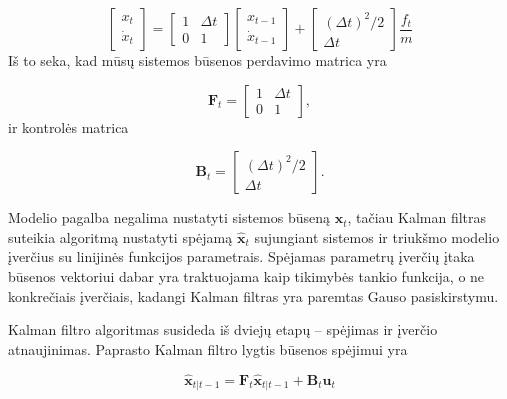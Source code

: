     \begin{equation}
        \left[ \begin{matrix} x_t \\ \dot{x}_t \end{matrix} \right] = 
        \left[ \begin{matrix} 1 & \Delta t \\ 0 & 1\end{matrix} \right]
        \left[ \begin{matrix} x_{t-1} \\ \dot{x}_{t-1} \end{matrix} \right] +
        \left[ \begin{matrix} (\Delta t)^2 / 2 \\ \Delta t \end{matrix} \right] \frac{f_t}{m}
    \end{equation}
    Iš to seka, kad mūsų sistemos būsenos perdavimo matrica yra 

    \begin{equation}
        \mathbf{F}_t = \left[ \begin{matrix} 1 & \Delta t \\ 0 & 1 \end{matrix} \right],
    \end{equation}
    ir kontrolės matrica

    \begin{equation}
        \mathbf{B}_t = \left[ \begin{matrix} (\Delta t)^2/2 \\ \Delta t \end{matrix} \right].
    \end{equation}

    Modelio pagalba negalima nustatyti sistemos būseną $\mathbf{x}_t$, tačiau Kalman filtras suteikia algoritmą nustatyti spėjamą $\hat{\mathbf{x}}_t$ sujungiant sistemos ir triukšmo modelio įverčius su linijinės funkcijos parametrais. Spėjamas parametrų įverčių įtaka būsenos vektoriui dabar yra traktuojama kaip tikimybės tankio funkcija, o ne konkrečiais įverčiais, kadangi Kalman filtras yra paremtas Gauso pasiskirstymu. 

    Kalman filtro algoritmas susideda iš dviejų etapų -- spėjimas ir įverčio atnaujinimas. Paprasto Kalman filtro lygtis būsenos spėjimui yra

    \begin{equation}
        \mathbf{\hat{x}}_{t|t-1} = \mathbf{F}_t\mathbf{\hat{x}}_{t|t-1} + \mathbf{B}_t \mathbf{u}_t
    \end{equation}


